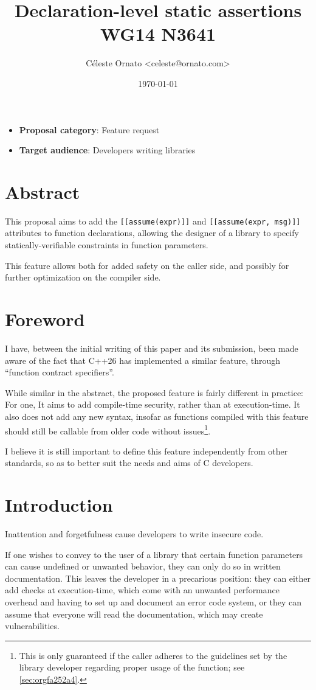 \documentclass[a4paper, 12pt]{article}
\author{Céleste Ornato <celeste@ornato.com>}
\date{\today}
\title{Declaration-level static assertions\\\medskip
\large WG14 N3641}
\begin{document}
\maketitle
\begin{itemize}
\item \textbf{Proposal category}: Feature request
\item \textbf{Target audience}: Developers writing libraries
\end{itemize}
\section{Abstract}
\label{sec:orge50960a}
This proposal aims to add the \texttt{[[assume(expr)]]} and \texttt{[[assume(expr, msg)]]}
attributes to function declarations, allowing the designer of a library to specify
statically-verifiable constraints in function parameters.

This feature allows both for added safety on the caller side, and possibly for
further optimization on the compiler side.
\section{Foreword}
\label{sec:orga5c4b6f}
I have, between the initial writing of this paper and its submission, been made aware
of the fact that C++26 has implemented a similar feature, through ``function contract
specifiers''.

While similar in the abstract, the proposed feature is fairly different in practice:
For one, It aims to add compile-time security, rather than at execution-time.
It also does not add any new syntax, insofar as functions compiled with this feature
should still be callable from older code without issues\footnote{This is only guaranteed if the caller adheres to the guidelines set by the library
developer regarding proper usage of the function; see \ref{sec:orgfa252a4}.}.

I believe it is still important to define this feature independently from other standards,
so as to better suit the needs and aims of C developers.
\section{Introduction}
\label{sec:orgb625cb3}
Inattention and forgetfulness cause developers to write insecure code.

If one wishes to convey to the user of a library that certain function parameters
can cause undefined or unwanted behavior, they can only do so in written
documentation.  This leaves the developer in a precarious position: they can
either add checks at execution-time, which come with an unwanted performance
overhead and having to set up and document an error code system,
or they can assume that everyone will read the documentation, which may create
vulnerabilities.
\end{document}
